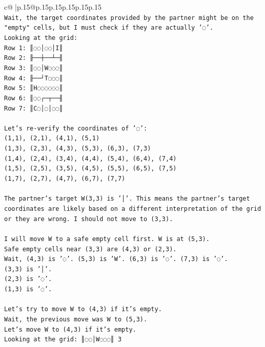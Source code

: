 \documentclass{article}
\begin{document}
{\begin{supertabular}{c@{$\;$}|p{.15\linewidth}@{}p{.15\linewidth}p{.15\linewidth}p{.15\linewidth}p{.15\linewidth}p{.15\linewidth}}
{{{\\ 
\texttt{Wait, the target coordinates provided by the partner might be on the "empty" cells, but I must check if they are actually '◌'.} \\
\texttt{Looking at the grid:} \\
\texttt{Row 1: ║◌◌│◌◌│I║} \\
\texttt{Row 2: ╟──┼──┴─╢} \\
\texttt{Row 3: ║◌◌│W◌◌◌║} \\
\texttt{Row 4: ╟──┘T◌◌◌║} \\
\texttt{Row 5: ║H◌◌◌◌◌◌║} \\
\texttt{Row 6: ║◌◌┌─┬──╢} \\
\texttt{Row 7: ║C◌│◌│◌◌║} \\
\\ 
\texttt{Let's re{-}verify the coordinates of '◌':} \\
\texttt{(1,1), (2,1), (4,1), (5,1)} \\
\texttt{(1,3), (2,3), (4,3), (5,3), (6,3), (7,3)} \\
\texttt{(1,4), (2,4), (3,4), (4,4), (5,4), (6,4), (7,4)} \\
\texttt{(1,5), (2,5), (3,5), (4,5), (5,5), (6,5), (7,5)} \\
\texttt{(1,7), (2,7), (4,7), (6,7), (7,7)} \\
\\ 
\texttt{The partner's target W(3,3) is '│'. This means the partner's target coordinates are likely based on a different interpretation of the grid or they are wrong. I should not move to (3,3).} \\
\\ 
\texttt{I will move W to a safe empty cell first. W is at (5,3).} \\
\texttt{Safe empty cells near (3,3) are (4,3) or (2,3).} \\
\texttt{Wait, (4,3) is '◌'. (5,3) is 'W'. (6,3) is '◌'. (7,3) is '◌'.} \\
\texttt{(3,3) is '│'.} \\
\texttt{(2,3) is '◌'.} \\
\texttt{(1,3) is '◌'.} \\
\\ 
\texttt{Let's try to move W to (4,3) if it's empty.} \\
\texttt{Wait, the previous move was W to (5,3).} \\
\texttt{Let's move W to (4,3) if it's empty.} \\
\texttt{Looking at the grid: ║◌◌│W◌◌◌║ 3} \\
}}}
\end{supertabular}}
\end{document}
